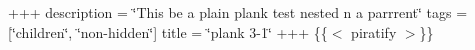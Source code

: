 +++ description = \char`\"{}\+This be a plain plank test nested \textquotesingle{}n a parrrent\char`\"{} tags = \mbox{[}\char`\"{}children\char`\"{}, \char`\"{}non-\/hidden\char`\"{}\mbox{]} title = \char`\"{}plank 3-\/1\char`\"{} +++ \{\{$<$ piratify $>$\}\} 